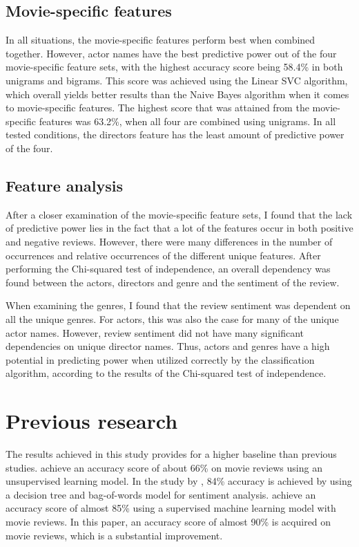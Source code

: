 \documentclass[
10pt, %
a4paper, %
oneside, %
headinclude,footinclude, %
] {book}%
\begin{document}
\subsection{Movie-specific features}

In all situations, the movie-specific features perform best when combined together. However, actor names have the best predictive power out of the four movie-specific feature sets, with the highest accuracy score being 58.4\% in both unigrams and bigrams. This score was achieved using the Linear SVC algorithm, which overall yields better results than the Naive Bayes algorithm when it comes to movie-specific features. The highest score that was attained from the movie-specific features was 63.2\%, when all four are combined using unigrams. In all tested conditions, the directors feature has the least amount of predictive power of the four.

\newpage

\subsection{Feature analysis}

After a closer examination of the movie-specific feature sets, I found that the lack of predictive power lies in the fact that a lot of the features occur in both positive and negative reviews. However, there were many differences in the number of occurrences and relative occurrences of the different unique features. After performing the Chi-squared test of independence, an overall dependency was found between the actors, directors and genre and the sentiment of the review. 

When examining the genres, I found that the review sentiment was dependent on all the unique genres. For actors, this was also the case for many of the unique actor names. However, review sentiment did not have many significant dependencies on unique director names. Thus, actors and genres have a high potential in predicting power when utilized correctly by the classification algorithm, according to the results of the Chi-squared test of independence.

\section{Previous research}

The results achieved in this study provides for a higher baseline than previous studies. \citet{turney2002thumbs} achieve an accuracy score of about 66\% on movie reviews using an unsupervised learning model. In the study by \citet{pouransari2014deep}, 84\% accuracy is achieved by using a decision tree and bag-of-words model for sentiment analysis. \citet{chaovalit2005movie} achieve an accuracy score of almost 85\% using a supervised machine learning model with movie reviews. In this paper, an accuracy score of almost 90\% is acquired on movie reviews, which is a substantial improvement.
\end{document}
